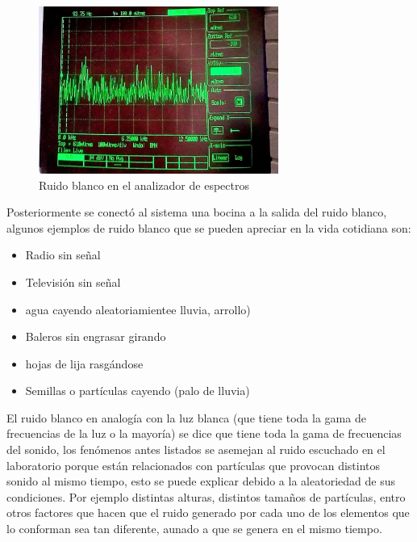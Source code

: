 \documentclass{article}
\begin{document}
\begin{figure}[h!]
    \centering
    \includegraphics[width=0.7\textwidth]{Imagenes/RuidoBlancoEspectros.jpg}
  
    \caption{Ruido blanco en el analizador de espectros}
    \label{fig:RuidoBlancoEspectros}
\end{figure}



Posteriormente se conectó al sistema una bocina a la salida del ruido blanco, algunos ejemplos de ruido blanco que se pueden apreciar en la vida cotidiana son:\\

\begin{itemize}
    \item Radio sin señal
    \item Televisión sin señal
    \item agua cayendo aleatoriamientee lluvia, arrollo)
    \item Baleros sin engrasar girando
    \item hojas de lija rasgándose
    \item Semillas o partículas cayendo (palo de lluvia)
\end{itemize}

El ruido blanco en analogía con la luz blanca (que tiene toda la gama de frecuencias de la luz o la mayoría) se dice que tiene toda la gama de frecuencias del sonido, los fenómenos antes listados se asemejan al ruido escuchado en el laboratorio porque están relacionados con partículas que provocan distintos sonido al mismo tiempo, esto se puede explicar debido a la aleatoriedad de sus condiciones. Por ejemplo distintas alturas, distintos tamaños de partículas, entro otros factores que hacen que el ruido generado por cada uno de los elementos que lo conforman sea tan diferente, aunado a que se genera en el mismo tiempo.\\
\end{document}
